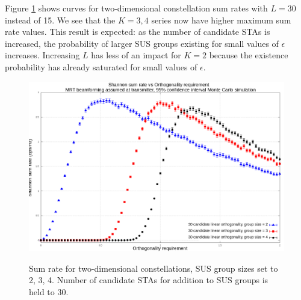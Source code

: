 Figure \ref{fig:30_candidate} shows  curves for two-dimensional constellation sum rates with $L = 30$ instead of 15. We see that the $K=3,4$ series now have higher maximum sum rate values. This result is expected: as the number of candidate STAs is increased, the probability of larger SUS groups existing for small values of $\epsilon$ increases. Increasing $L$ has less of an impact for $K=2$ because the existence probability has already saturated for small values of $\epsilon$.
\begin{figure}
    \centering
    \includegraphics[width=24cm]{figs/30_candidate_mrt.png}\\
    \caption{Sum rate for two-dimensional constellations, SUS group sizes set to 2, 3, 4. Number of candidate STAs for addition to SUS groups is held to 30.}
    \label{fig:30_candidate}
\end{figure}
